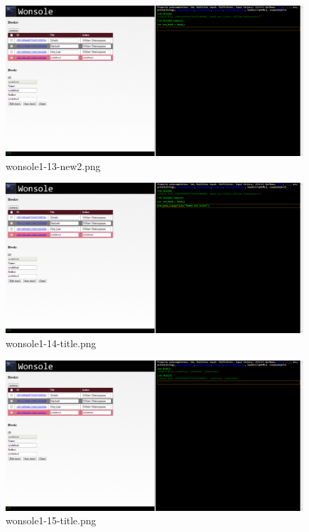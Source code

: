 \clearpage
\begin{figure}
\includegraphics[width=\textwidth]{screenshot/wonsole1-13-new2.png}
\caption{wonsole1-13-new2.png}
\label{wonsole1-13-new2.png}
\end{figure}


\begin{figure}
\includegraphics[width=\textwidth]{screenshot/wonsole1-14-title.png}
\caption{wonsole1-14-title.png}
\label{wonsole1-14-title.png}
\end{figure}


\clearpage
\begin{figure}
\includegraphics[width=\textwidth]{screenshot/wonsole1-15-title.png}
\caption{wonsole1-15-title.png}
\label{wonsole1-15-title.png}
\end{figure}


